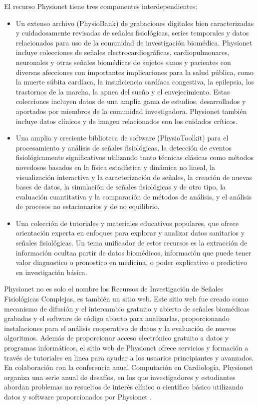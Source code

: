\documentclass[12pt,letterpaper,oneside,openright]{book}
\begin{document}
El recurso Physionet tiene tres componentes interdependientes:
\begin{itemize}
	\item Un extenso archivo (\guillemetleft PhysioBank\guillemetright) de grabaciones digitales bien caracterizadas y cuidadosamente revisadas de señales fisiológicas, series temporales y datos relacionados para uso de la comunidad de investigación biomédica. Physionet incluye colecciones de señales electrocardiográficas, cardiopulmonares, neuronales y otras señales biomédicas de sujetos sanos y pacientes con diversas afecciones con importantes implicaciones para la salud pública, como la muerte súbita cardíaca, la insuficiencia cardíaca congestiva, la epilepsia, los trastornos de la marcha, la apnea del sueño y el envejecimiento. Estas colecciones incluyen datos de una amplia gama de estudios, desarrollados y aportados por miembros de la comunidad investigadora. Physionet también incluye datos clínicos y de imagen relacionados con los cuidados críticos.
	\item Una amplia y creciente biblioteca de software (\guillemetleft PhysioToolkit\guillemetright) para el procesamiento y análisis de señales fisiológicas, la detección de eventos fisiológicamente significativos utilizando tanto técnicas clásicas como métodos novedosos basados en la física estadística y dinámica no lineal, la visualización interactiva y la caracterización de señales, la creación de nuevas bases de datos, la simulación de señales fisiológicas y de otro tipo, la evaluación cuantitativa y la comparación de métodos de análisis, y el análisis de procesos no estacionarios y de no equilibrio. 
	\item Una colección de tutoriales y materiales educativos populares, que ofrece orientación experta en enfoques para explorar y analizar datos sanitarios y señales fisiológicas. Un tema unificador de estos recursos es la extracción de información \guillemetleft oculta\guillemetright a partir de datos biomédicos, información que puede tener valor diagnostico o pronostico en medicina, o poder explicativo o predictivo en investigación básica.
\end{itemize}

Physionet no es solo el nombre los Recursos de Investigación de Señales Fisiológicas Complejas, es también un sitio web. Este sitio web fue creado como mecanismo de difusión y el intercambio gratuito y abierto de señales biomédicas grabadas y el software de código abierto para analizarlas, proporcionando instalaciones para el análisis cooperativo de datos y la evaluación de nuevos algoritmos. Además de proporcionar acceso electrónico gratuito a datos y programas informáticos, el sitio web de Physionet ofrece servicios y formación a través de tutoriales en linea para ayudar a los usuarios principiantes y avanzados. En colaboración con la conferencia anual \guillemetleft Computación en Cardiología\guillemetright, Physionet organiza una serie anual de desafíos, en los que investigadores y estudiantes abordan problemas no resueltos de interés clínico o científico básico utilizando datos y software proporcionados por Physionet \cite{physionet2000}.
\end{document}
